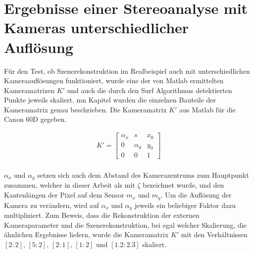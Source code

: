 \label{sec:realAuf} 

\section{Ergebnisse einer Stereoanalyse mit Kameras unterschiedlicher Auflösung}

Für den Test, ob Szenerekonstruktion im Realbeispiel auch mit unterschiedlichen Kameraauflösungen funktioniert, wurde eine der von Matlab ermittelten Kameramatrizen $K'$ und auch die durch den Surf Algorithmus detektierten Punkte jeweils skaliert. mn Kapitel  wurden die einzelnen Bauteile der Kameramatrix genau beschrieben. Die Kameramatrix $K'$ aus Matlab für die Canon 60D gegeben.


\begin{gather}
		K'=\begin{bmatrix}
\alpha_x&s&x_{0}\\
0&\alpha_y&y_{0}\\
0&0&1
\end{bmatrix}
\end{gather} \\

$\alpha_x$ und $\alpha_y$ setzen sich auch dem Abstand des Kamerazentrums zum Hauptpunkt zusammen, welcher in dieser Arbeit als mit $\zeta$ bezeichnet wurde, und den Kantenlängen der Pixel auf dem Sensor $m_x$ und $m_y$. Um die Auflösung der Kamera zu verändern, wird auf $\alpha_x$ und $\alpha_y$ jeweils ein beliebiger Faktor dazu multipliziert. Zum Beweis, dass die Rekonstruktion der externen Kameraparameter und die Szenerekonstruktion, bei egal welcher Skalierung, die ähnlichen Ergebnisse liefern, wurde die Kameramatrix $K'$ mit den Verhältnissen $[2:2], \, [5:2],\, [2:1], \, [1:2]$ und $[1.2:2.3]$ skaliert. 

